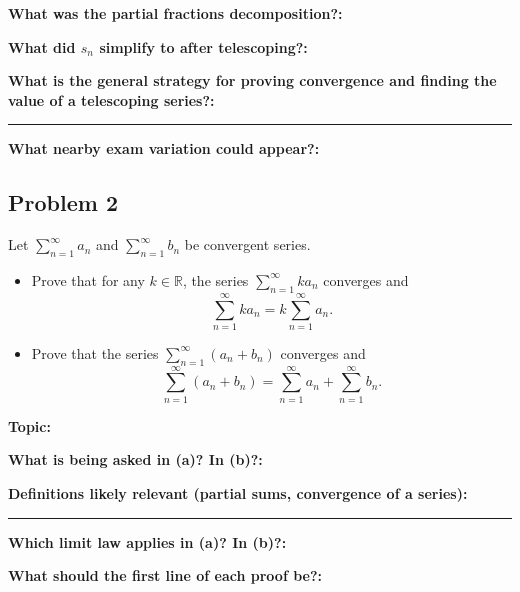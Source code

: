 \documentclass[12pt]{article}
\newcommand{\fillfield}[1]{%
  \par\noindent\textbf{#1:}\enspace\hrulefill\par\vspace{3pt}%
}
\newcommand{\fillfieldlong}[1]{%
  \par\noindent\textbf{#1:}\par\vspace{1.5cm}%
  \noindent\rule{\linewidth}{0.35pt}\par\vspace{4pt}%
}
\begin{document}
\bigskip

\begin{tcolorbox}[
  enhanced, breakable,
  colback  = reflectcyan,
  colframe = cyan!55!black,
  fonttitle = \bfseries,
  title = {\textsc{Reflection \& Variation}}
]
\fillfield{What was the partial fractions decomposition?}
\fillfield{What did $s_n$ simplify to after telescoping?}
\fillfieldlong{What is the general strategy for proving convergence and finding the value of a telescoping series?}
\fillfield{What nearby exam variation could appear?}
\end{tcolorbox}

\newpage
\subsection{Problem 2}

\begin{tcolorbox}[
  enhanced, breakable,
  colback  = probblue,
  colframe = blue!55!black,
  fonttitle = \bfseries,
  title = {\textsc{Problem Statement}\hfill Homework 6, Problem 2}
]
Let $\sum_{n=1}^{\infty} a_n$ and $\sum_{n=1}^{\infty} b_n$ be convergent series.
\begin{itemize}[nosep, leftmargin=1.8em]
  \item[(a)] Prove that for any $k \in \mathbb{R}$, the series $\sum_{n=1}^{\infty} ka_n$
    converges and
    \[
      \sum_{n=1}^{\infty} ka_n = k\sum_{n=1}^{\infty} a_n.
    \]
  \item[(b)] Prove that the series $\sum_{n=1}^{\infty}(a_n + b_n)$ converges and
    \[
      \sum_{n=1}^{\infty}(a_n + b_n) = \sum_{n=1}^{\infty} a_n + \sum_{n=1}^{\infty} b_n.
    \]
\end{itemize}
\end{tcolorbox}

\bigskip

\begin{tcolorbox}[
  enhanced, breakable,
  colback  = pass1green,
  colframe = green!55!black,
  fonttitle = \bfseries,
  title = {Pass 1 \enspace\textbf{--}\enspace First Diagnosis}
]
\fillfield{Topic}
\fillfield{What is being asked in (a)? In (b)?}
\fillfieldlong{Definitions likely relevant (partial sums, convergence of a series)}
\fillfield{Which limit law applies in (a)? In (b)?}
\fillfield{What should the first line of each proof be?}
\end{tcolorbox}
\end{document}
